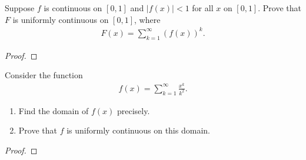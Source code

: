 \documentclass[11pt,twoside,openany]{memoir}
\begin{document}
\newpage
\fancyhead[L]{\scalebox{0.9}{Series of Functions}}
\fancyhead[R]{\scalebox{0.9}{Appeared on: S21}}
\begin{problem}
    Suppose $f$ is continuous on $[0,1]$ and $|f(x)| < 1$ for all $x$ on $[0,1]$. Prove that $F$ is uniformly continuous on $[0,1]$, where
        \begin{equation*}
        \begin{split}
            F(x) = \sum_{k = 1}^\infty(f(x))^k.
        \end{split}
        \end{equation*}
\end{problem}
\begin{proof}
\end{proof}

\newpage
\fancyhead[L]{\scalebox{0.9}{Series of Functions}}
\fancyhead[R]{\scalebox{0.9}{Appeared on: W21}}
\begin{problem}
    Consider the function 
    \begin{equation*}
    \begin{split}
        f(x) = \sum_{k = 1}^\infty \frac{x^k}{k^2}.
    \end{split}
    \end{equation*}
    \begin{enumerate}[label = (\arabic*)]
        \item Find the domain of $f(x)$ precisely.
        \item Prove that $f$ is uniformly continuous on this domain.
    \end{enumerate}
\end{problem}
\begin{proof}
\end{proof}
\end{document}
